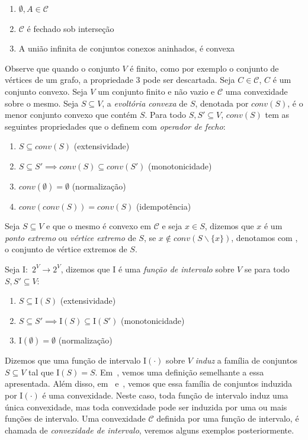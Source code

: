 \begin{enumerate}
    \item $\emptyset, A \in \mathcal{C}$
    \item $\mathcal{C}$ é fechado sob interseção
    \item A união infinita de conjuntos conexos aninhados, é convexa
\end{enumerate}

Observe que quando o conjunto $V$ é finito, como por exemplo o conjunto de vértices de um grafo, a propriedade $3$ pode ser descartada. Seja $C \in \mathcal{C}$, $C$ é um conjunto convexo. Seja $V$ um conjunto finito e não vazio e $\mathcal{C}$ uma convexidade sobre o mesmo. Seja $S \subseteq V$, a \emph{evoltória convexa} de $S$, denotada por $conv(S)$, é o menor conjunto convexo que contém $S$. Para todo $S, S' \subseteq V$, $conv(S)$ tem as seguintes propriedades que o definem com \emph{operador de fecho}:

\begin{enumerate}
    \item $S \subseteq conv(S)$ (extensividade)
    \item $S \subseteq S' \implies conv(S) \subseteq conv(S')$ (monotonicidade)
    \item $conv(\emptyset) = \emptyset$ (normalização)
    \item $conv(conv(S)) = conv(S)$ (idempotência)
\end{enumerate}

Seja $S \subseteq V$ e que o mesmo é convexo em $\mathcal{C}$ e seja $x \in S$, dizemos que $x$ é um \emph{ponto extremo} ou \emph{vértice extremo} de $S$, se $x \notin conv(S\backslash \{x\})$, denotamos com , o conjunto de vértice extremos de $S$.

Seja I:~$2^V \longrightarrow 2^V$, dizemos que I é uma \emph{função de intervalo} sobre $V$ se para todo $S, S' \subseteq V$:

\begin{enumerate}
    \item $S \subseteq \text{I}(S)$ (extensividade)
    \item $S \subseteq S' \implies \text{I}(S) \subseteq \text{I}(S')$ (monotonicidade)
    \item I$(\emptyset) = \emptyset$ (normalização)
\end{enumerate}

Dizemos que uma função de intervalo I$(\cdot)$ sobre $V$ \emph{induz} a família de conjuntos $S\subseteq V$ tal que I$(S) = S$. Em~\cite{calder1971}, vemos uma definição semelhante a essa apresentada. Além disso, em~\cite{calder1971} e~\cite{vandevel1993}, vemos que essa família de conjuntos induzida por I$(\cdot)$ é uma convexidade. Neste caso, toda função de intervalo induz uma única convexidade, mas toda convexidade pode ser induzida por uma ou mais funções de intervalo. Uma convexidade $\mathcal{C}$ definida por uma função de intervalo, é chamada de \emph{convexidade de intervalo}, veremos alguns exemplos posteriormente.

